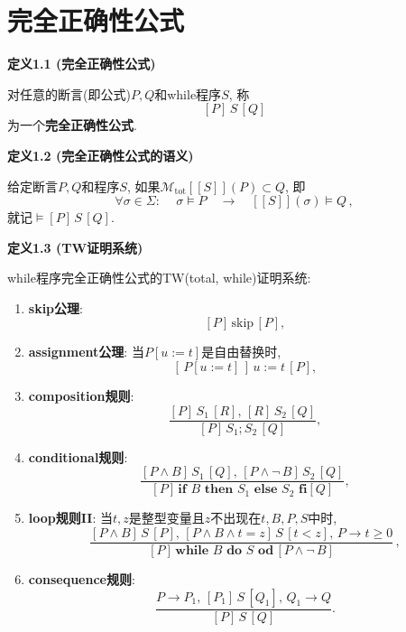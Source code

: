 \documentclass[UTF8]{ctexart}
\begin{document}
\setlength{\abovedisplayskip}{1pt}
\setlength{\belowdisplayskip}{1pt}

\section{完全正确性公式}

\hypertarget{sec:定义1.1}{}
\noindent\textbf{定义1.1 (完全正确性公式)}

对任意的断言(即公式)$P,Q$和while程序$S$, 称
\[
    [P]\,S\,[Q]
\]
为一个\textbf{完全正确性公式}.

\vspace{10pt}

\hypertarget{sec:定义1.2}{}
\noindent\textbf{定义1.2 (完全正确性公式的语义)}

给定断言$P,Q$和程序$S$, 如果$\mathcal{M}_{\mathrm{tot}}[\![S]\!](P)\subset Q$, 即
\[
    \forall\sigma\in\Sigma:\quad\,\sigma\models P
    \quad\to\quad[\![S]\!](\sigma)\models Q\,,
\]
就记$\models[P]\,S\,[Q]$.

\vspace{10pt}

\hypertarget{sec:定义1.3}{}
\noindent\textbf{定义1.3 (TW证明系统)}

while程序完全正确性公式的TW(total, while)证明系统:
\begin{enumerate}
    \item \textbf{skip公理}:
    \[
        [P]\,\mathrm{skip}\,[P],
    \]
    \item \textbf{assignment公理}: 当$P[u:=t]$是自由替换时,
    \[
        [\,P[u:=t]\,]\,u:=t\,[P],
    \]
    \item \textbf{composition规则}:
    \[
        \frac{[P]\,S_1\,[R],\,[R]\,S_2\,[Q]}
        {[P]\,S_1;S_2\,[Q]},
    \]
    \item \textbf{conditional规则}:
    \[
        \frac{[P\land B]\,S_1\,[Q],\,[P\land\neg\,B]\,S_2\,[Q]}
        {[P]\,\mathbf{if}\,\,B\,\,\mathbf{then}\,\,S_1\,\,\mathbf{else}
        \,\,S_2\,\,\mathbf{fi}[Q]},
    \]
    \item \textbf{loop规则II}: 当$t,z$是整型变量且$z$不出现在$t,B,P,S$中时,
    \vspace{5pt}
    \[
        \frac{[P\land B]\,S\,[P],\,[P\land B\land t=z]\,S\,[t<z],\,
        P\to t\geqslant 0}
        {[P]\,\mathbf{while}\,\,B\,\,\mathbf{do}\,\,S\,\,\mathbf{od}\,
        [P\land\neg\,B]}\,,
    \]
    \item \textbf{consequence规则}:
    \[
        \frac{P\to P_1,\,[P_1]\,S\,[Q_1],\,Q_1\to Q}
        {[P]\,S\,[Q]}.
    \]
\end{enumerate}
\end{document}
